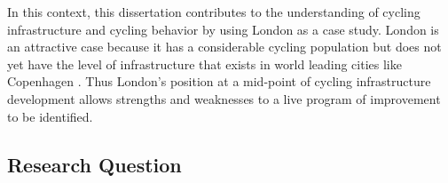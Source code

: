
In this context, this dissertation contributes to the understanding of cycling infrastructure and cycling behavior by using London as a case study. London is an attractive case because it has a considerable cycling population but does not yet have the level of infrastructure that exists in world leading cities like Copenhagen \parencite{mayor}. Thus London's position at a mid-point of cycling infrastructure development allows strengths and weaknesses to a live program of improvement to be identified.


\subsection{Research Question}
%


